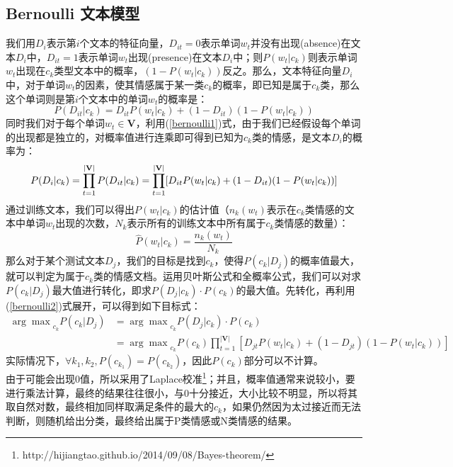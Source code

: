 \documentclass[11pt]{article}
\begin{document}
\subsection{Bernoulli 文本模型}\label{bernoulli5}
\hspace{1.6em} 我们用$D_i$表示第$i$个文本的特征向量，$D_{it}=0$表示单词$w_t$并没有出现(absence)在文本$D_i$中，$D_{it}=1$表示单词$w_t$出现(presence)在文本$D_i$中；则$P(w_t|c_k)$则表示单词$w_t$出现在$c_k$类型文本中的概率，$(1-P(w_t|c_k))$反之。那么，文本特征向量$D_i$中，对于单词$w_t$的因素，使其情感属于某一类$c_k$的概率，即已知是属于$c_k$类，那么这个单词则是第$i$个文本中的单词$w_t$的概率是：
\begin{equation}\label{bernoulli1}
P(D_{it}|c_k)=D_{it}P(w_t|c_k)+(1-D_{it})(1-P(w_t|c_k))
\end{equation}
\indent 同时我们对于每个单词$w_t \in \mathbf{V}$，利用(\ref{bernoulli1})式，由于我们已经假设每个单词的出现都是独立的，对概率值进行连乘即可得到已知为$c_k$类的情感，是文本$D_i$的概率为：
\begin{equation}\label{bernoulli2}
P(D_{i}|c_k)=\prod_{t=1}^{|\mathbf{V}|}P(D_{it}|c_k)\\
=\prod_{t=1}^{|\mathbf{V}|}[D_{it}P(w_t|c_k)+(1-D_{it})(1-P(w_t|c_k))]
\end{equation}
\indent 通过训练文本，我们可以得出$P(w_t|c_k)$的估计值（$n_k(w_t)$表示在$c_k$类情感的文本中单词$w_t$出现的次数，$N_k$表示所有的训练文本中所有属于$c_k$类情感的数量）：
\begin{equation}\label{bernoulli3}
\hat{P}(w_t|c_k) = \frac{n_k(w_t)}{N_k}
\end{equation}
\indent 那么对于某个测试文本$D_j$，我们的目标是找到$c_k$，使得$P(c_k|D_j)$的概率值最大，就可以判定为属于$c_k$类的情感文档。运用贝叶斯公式和全概率公式，我们可以对求$P(c_k|D_j)$最大值进行转化，即求$P(D_j|c_k)\cdot P(c_k)$的最大值。先转化，再利用(\ref{bernoulli2})式展开，可以得到如下目标式：
\begin{equation}\label{bernoulli4}
\begin{split}
{\arg\!\max}_{c_k} P(c_{k}|D_j)&={\arg\!\max}_{c_k}P(D_j|c_k)\cdot P(c_k)\\
&={\arg\!\max}_{c_k}P(c_k)\prod_{t=1}^{|\mathbf{V}|}[D_{jt}P(w_t|c_k)+(1-D_{jt})(1-P(w_t|c_k))]
\end{split}
\end{equation}
\indent 实际情况下，$\forall k_1, k_2, P(c_{k_1}) = P(c_{k_2})$，因此$P(c_k)$部分可以不计算。\\
\indent 由于可能会出现0值，所以采用了Laplace校准\footnote{http://hijiangtao.github.io/2014/09/08/Bayes-theorem/}；并且，概率值通常来说较小，要进行乘法计算，最终的结果往往很小，与0十分接近，大小比较不明显，所以将其取自然对数，最终相加同样取满足条件的最大的$c_k$，如果仍然因为太过接近而无法判断，则随机给出分类，最终给出属于P类情感或N类情感的结果。
\end{document}

